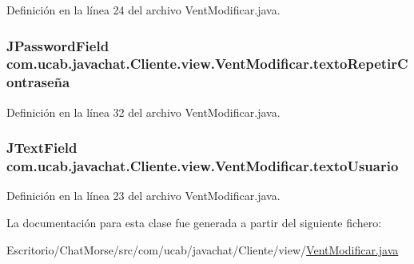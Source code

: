 Definición en la línea 24 del archivo Vent\-Modificar.\-java.

\hypertarget{classcom_1_1ucab_1_1javachat_1_1_cliente_1_1view_1_1_vent_modificar_a0a22b6c11825ee03316be0f9f12783ab}{
\subsubsection[{texto\-Repetir\-Contraseña}]{\setlength{\rightskip}{0pt plus 5cm}J\-Password\-Field com.\-ucab.\-javachat.\-Cliente.\-view.\-Vent\-Modificar.\-texto\-Repetir\-Contraseña}}\label{classcom_1_1ucab_1_1javachat_1_1_cliente_1_1view_1_1_vent_modificar_a0a22b6c11825ee03316be0f9f12783ab}


Definición en la línea 32 del archivo Vent\-Modificar.\-java.

\hypertarget{classcom_1_1ucab_1_1javachat_1_1_cliente_1_1view_1_1_vent_modificar_a474b74c08d40f00481bc7e7c6004b40d}{
\subsubsection[{texto\-Usuario}]{\setlength{\rightskip}{0pt plus 5cm}J\-Text\-Field com.\-ucab.\-javachat.\-Cliente.\-view.\-Vent\-Modificar.\-texto\-Usuario}}\label{classcom_1_1ucab_1_1javachat_1_1_cliente_1_1view_1_1_vent_modificar_a474b74c08d40f00481bc7e7c6004b40d}


Definición en la línea 23 del archivo Vent\-Modificar.\-java.



La documentación para esta clase fue generada a partir del siguiente fichero\-:\begin{DoxyCompactItemize}
\item 
Escritorio/\-Chat\-Morse/src/com/ucab/javachat/\-Cliente/view/\hyperlink{_vent_modificar_8java}{Vent\-Modificar.\-java}\end{DoxyCompactItemize}
